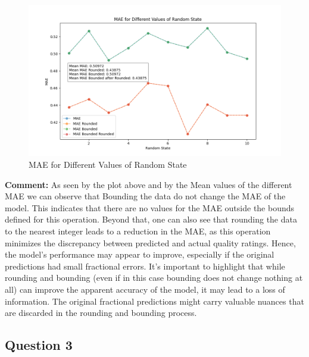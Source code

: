 \documentclass{article}
\begin{document}
\begin{figure}[H]
    \includegraphics*[width=\linewidth]{images/mae.png}
    \caption{MAE for Different Values of Random State}
\end{figure}

\textbf{Comment:}
As seen by the plot above and by the Mean values of the different MAE we can observe that Bounding the data do not change the MAE of the model. This indicates that there are no values for the MAE outside the bounds defined for this operation. 
Beyond that, one can also see that rounding the data to the nearest integer leads to a reduction in the MAE, as this operation minimizes the discrepancy between predicted and actual quality ratings. Hence, the model's performance may appear to improve, especially if the original predictions had small fractional errors.
It's important to highlight that while rounding and bounding (even if in this case bounding does not change nothing at all) can improve the apparent accuracy of the model, it may lead to a loss of information. The original fractional predictions might carry valuable nuances that are discarded in the rounding and bounding process.

\subsection*{Question 3}
\end{document}
